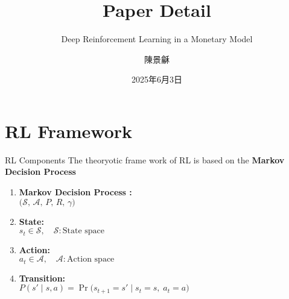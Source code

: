 \documentclass{beamer}
\author{陳景龢}
\title{Paper Detail}
\subtitle{Deep Reinforcement Learning in a Monetary Model}
\institute[NCCU]
{\normalsize{Econ Dept\quad NCCU\quad }}
\date{2025年6月3日} %
\begin{document}
\begin{frame}
    \titlepage
    
    \begin{figure}[htpb]
        \begin{center}
        \end{center}
    \end{figure}
\end{frame}

\begin{frame}
    \tableofcontents[sectionstyle=show,subsectionstyle=show/shaded/hide,subsubsectionstyle=show/shaded/hide]
\end{frame}

\section{RL Framework}
    \begin{frame}{RL Components}
    The theoryotic frame work of RL is based on the \textbf{Markov Decision Process}
    
    \begin{enumerate}

        \item \textbf{Markov Decision Process : } \\
        $\bigl(\mathcal{S},\,\mathcal{A},\,P,\,R,\,\gamma\bigr)$
        
        \item \textbf{State:} \\
        $s_t \in \mathcal{S}, \quad \mathcal{S}: \text{State space}$
    
        \item \textbf{Action:} \\
        $a_t \in \mathcal{A}, 
        \quad \mathcal{A}: \text{Action space}$
    
        \item \textbf{Transition:} \\
        $P(s' \mid s, a)
        = \Pr\bigl(s_{t+1}=s' \mid s_t=s,\;a_t=a\bigr)$
    \end{enumerate}
\end{frame}
\end{document}
